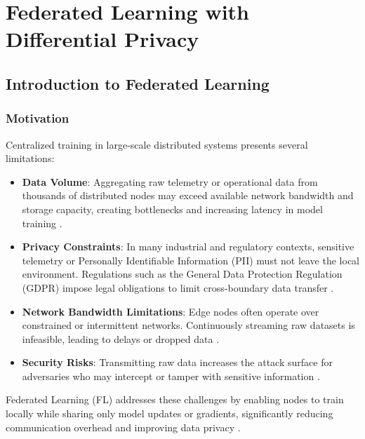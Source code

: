\chapter{Federated Learning with Differential Privacy}
\label{ch:federated_learning}

\section{Introduction to Federated Learning}
\label{sec:fl_introduction}

\subsection{Motivation}
\label{subsec:fl_motivation}

Centralized training in large-scale distributed systems presents several 
limitations:

\begin{itemize}
    \item \textbf{Data Volume}: Aggregating raw telemetry or operational data 
    from thousands of distributed nodes may exceed available network bandwidth 
    and storage capacity, creating bottlenecks and increasing latency in model 
    training \cite{li2020federated}.
    
    \item \textbf{Privacy Constraints}: In many industrial and regulatory contexts, 
    sensitive telemetry or Personally Identifiable Information (PII) must not 
    leave the local environment. Regulations such as the General Data Protection 
    Regulation (GDPR) \cite{gdpr2016regulation} impose legal obligations to limit 
    cross-boundary data transfer \cite{kairouz2021advances}.
    
    \item \textbf{Network Bandwidth Limitations}: Edge nodes often operate over 
    constrained or intermittent networks. Continuously streaming raw datasets is 
    infeasible, leading to delays or dropped data \cite{bonawitz2019towards}.
    
    \item \textbf{Security Risks}: Transmitting raw data increases the attack 
    surface for adversaries who may intercept or tamper with sensitive information 
    \cite{xu2021federated}.
\end{itemize}

Federated Learning (FL) addresses these challenges by enabling nodes to train 
locally while sharing only model updates or gradients, significantly reducing 
communication overhead and improving data privacy \cite{mcmahan2017communication}.

